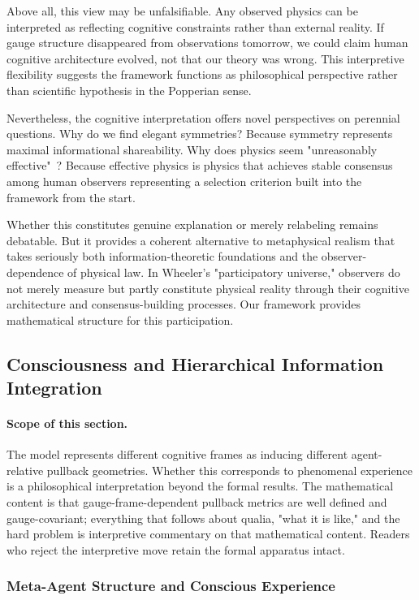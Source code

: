 \documentclass[11pt]{article}
\begin{document}
Above all, this view may be unfalsifiable. Any observed physics can be interpreted as reflecting cognitive constraints rather than external reality. If gauge structure disappeared from observations tomorrow, we could claim human cognitive architecture evolved, not that our theory was wrong. This interpretive flexibility suggests the framework functions as philosophical perspective rather than scientific hypothesis in the Popperian sense.

Nevertheless, the cognitive interpretation offers novel perspectives on perennial questions. Why do we find elegant symmetries? Because symmetry represents maximal informational shareability. Why does physics seem "unreasonably effective"~\cite{Wigner1960}? Because effective physics is physics that achieves stable consensus among human observers representing a selection criterion built into the framework from the start.

Whether this constitutes genuine explanation or merely relabeling remains debatable. But it provides a coherent alternative to metaphysical realism that takes seriously both information-theoretic foundations and the observer-dependence of physical law. In Wheeler's "participatory universe," observers do not merely measure but partly constitute physical reality through their cognitive architecture and consensus-building processes. Our framework provides mathematical structure for this participation.

\subsection{Consciousness and Hierarchical Information Integration}
\label{sec:consciousness_section}

\paragraph{Scope of this section.}
The model represents different cognitive frames as inducing different agent-relative pullback geometries. Whether this corresponds to phenomenal experience is a philosophical interpretation beyond the formal results. The mathematical content is that gauge-frame-dependent pullback metrics are well defined and gauge-covariant; everything that follows about qualia, "what it is like," and the hard problem is interpretive commentary on that mathematical content. Readers who reject the interpretive move retain the formal apparatus intact.

\subsubsection{Meta-Agent Structure and Conscious Experience}
\end{document}
